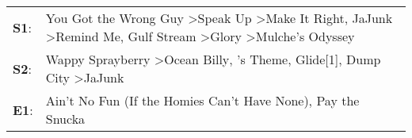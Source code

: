 \begin{supertabular}{p{0.03\textwidth}p{0.92\textwidth}}
 \textbf{S1}:  &  You Got the Wrong Guy\textsuperscript{} \textgreater \enspace Speak Up\textsuperscript{} \textgreater \enspace Make It Right\textsuperscript{}, \enspace JaJunk\textsuperscript{} \textgreater \enspace Remind Me\textsuperscript{}, \enspace Gulf Stream\textsuperscript{} \textgreater \enspace Glory\textsuperscript{} \textgreater \enspace Mulche's Odyssey\textsuperscript{}  \enspace  \\
 \textbf{S2}:  &                                                                                                                             Wappy Sprayberry\textsuperscript{} \textgreater \enspace Ocean Billy\textsuperscript{}, 's Theme\textsuperscript{}, \enspace Glide[1]\textsuperscript{}, \enspace Dump City\textsuperscript{} \textgreater \enspace JaJunk\textsuperscript{}  \enspace  \\
 \textbf{E1}:  &                                                                                                                                                                                                                                                                           Ain't No Fun (If the Homies Can't Have None)\textsuperscript{}, \enspace Pay the Snucka\textsuperscript{}  \enspace  \\
\end{supertabular}
